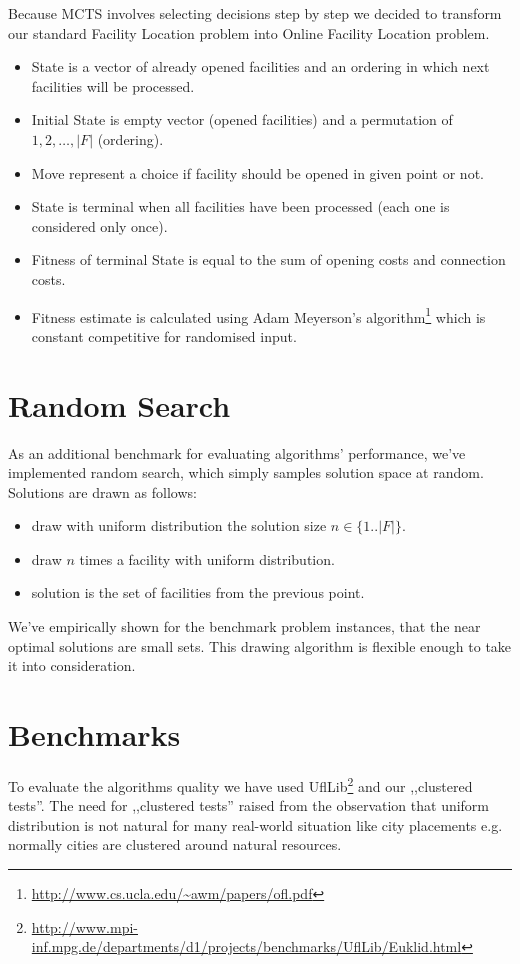 Because MCTS involves selecting decisions step by step we decided to transform our
standard Facility Location problem into Online Facility Location problem.
\begin{itemize}
\item State is a vector of already opened facilities and an ordering in which
next facilities will be processed.
\item Initial State is empty vector (opened facilities) and a permutation
of $1,2,\dots, |F|$ (ordering).
\item Move represent a choice if facility should be opened in given point or not.
\item State is terminal when all facilities have been processed (each one is
considered only once).
\item Fitness of terminal State is equal to the sum of opening costs and connection costs.
\item Fitness estimate is calculated using Adam Meyerson's algorithm\footnote{\url{http://www.cs.ucla.edu/~awm/papers/ofl.pdf}}
which is constant competitive for randomised input.
\end{itemize}

\section{Random Search}

As an additional benchmark for evaluating algorithms' performance, we've implemented
random search, which simply samples solution space at random. Solutions are drawn as follows:
\begin{itemize}
\item draw with uniform distribution the solution size $n \in \{1..|F|\}$.
\item draw $n$ times a facility with uniform distribution.
\item solution is the set of facilities from the previous point.
\end{itemize}

We've empirically shown for the benchmark problem instances, that the near optimal
solutions are small sets. This drawing algorithm is flexible enough to take it
into consideration.

\section{Benchmarks}
To evaluate the algorithms quality we have used UflLib\footnote{\url{http://www.mpi-inf.mpg.de/departments/d1/projects/benchmarks/UflLib/Euklid.html}}
and our ,,clustered tests''. The need for ,,clustered tests'' raised from the observation that
uniform distribution is not natural for many real-world situation like city placements
e.g. normally cities are clustered around natural resources.

